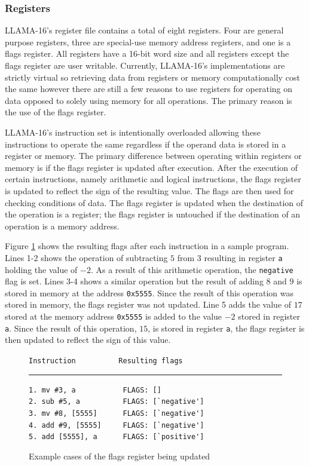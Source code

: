 \documentclass[man,hidelinks,floatsintext]{apa7}
\begin{document}
\subsubsection{Registers}
LLAMA-16's register file contains a total of eight registers. Four are general purpose registers, three are special-use memory address registers, and one is a flags register. All registers have a 16-bit word size and all registers except the flags register are user writable. Currently, LLAMA-16's implementations are strictly virtual so retrieving data from registers or memory computationally cost the same however there are still a few reasons to use registers for operating on data opposed to solely using memory for all operations. The primary reason is the use of the flags register.\par
LLAMA-16's instruction set is intentionally overloaded allowing these instructions to operate the same regardless if the operand data is stored in a register or memory. The primary difference between operating within registers or memory is if the flags register is updated after execution. After the execution of certain instructions, namely arithmetic and logical instructions, the flags register is updated to reflect the sign of the resulting value. The flags are then used for checking conditions of data. The flags register is updated when the destination of the operation is a register; the flags register is untouched if the destination of an operation is a memory address.\par
Figure \ref{fig:flagsinstr} shows the resulting flags after each instruction in a sample program. Lines 1-2 shows the operation of subtracting $5$ from $3$ resulting in register \verb|a| holding the value of $-2$. As a result of this arithmetic operation, the \verb|negative| flag is set. Lines 3-4 shows a similar operation but the result of adding $8$ and $9$ is stored in memory at the address \verb|0x5555|. Since the result of this operation was stored in memory, the flags register was not updated. Line 5 adds the value of $17$ stored at the memory address \verb|0x5555| is added to the value $-2$ stored in register \verb|a|. Since the result of this operation, $15$, is stored in register \verb|a|, the flags register is then updated to reflect the sign of this value.\par
\begin{figure}[h]
  \centering
  \captionsetup{justification=centering}
  \begin{singlespace}
  \verb|Instruction          Resulting flags     |\\
  \rule{0.6\linewidth}{.5pt}
  \verb|1. mv #3, a           FLAGS: []           |\\
  \verb|2. sub #5, a          FLAGS: [`negative']|\\
  \verb|3. mv #8, [5555]      FLAGS: [`negative']|\\
  \verb|4. add #9, [5555]     FLAGS: [`negative']|\\
  \verb|5. add [5555], a      FLAGS: [`positive']|\\
  \end{singlespace}
  \vspace*{3mm}
  \caption{Example cases of the flags register being updated}
  \label{fig:flagsinstr}
\end{figure}
\end{document}
